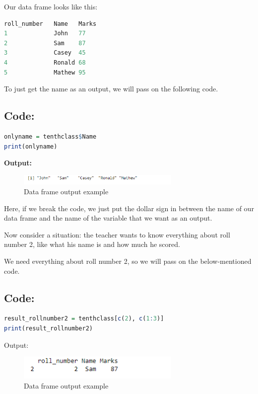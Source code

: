 \documentclass[10pt]{book}
\begin{document}
Our data frame looks like this:

\begin{lstlisting}[language=R]
roll_number   Name   Marks
1             John   77
2             Sam    87
3             Casey  45
4             Ronald 68
5             Mathew 95
\end{lstlisting}

To just get the name as an output, we will pass on the following code.

\subsection*{Code:}
\begin{lstlisting}[language=R]
onlyname = tenthclass$Name
print(onlyname)
\end{lstlisting}

\textbf{Output:}
\begin{figure}[H]
    \begin{flushleft}
        \includegraphics[width=0.7\textwidth]{Data-Frames-in-R-1-4.png}
        \caption{Data frame output example}
        \label{fig:dataframe}
    \end{flushleft}
\end{figure}

Here, if we break the code, we just put the dollar sign in between the name of our data frame and the name of the variable that we want as an output.

Now consider a situation: the teacher wants to know everything about roll number 2, like what his name is and how much he scored.

We need everything about roll number 2, so we will pass on the below-mentioned code.

\subsection*{Code:}
\begin{lstlisting}[language=R]
result_rollnumber2 = tenthclass[c(2), c(1:3)]
print(result_rollnumber2)
\end{lstlisting}

\noindent Output:
\begin{figure}[H]
    \begin{flushleft}
        \includegraphics[width=0.7\textwidth]{Data-Frames-in-R-1-5.png}
        \caption{Data frame output example}
        \label{fig:dataframe}
    \end{flushleft}
\end{figure}
\end{document}
